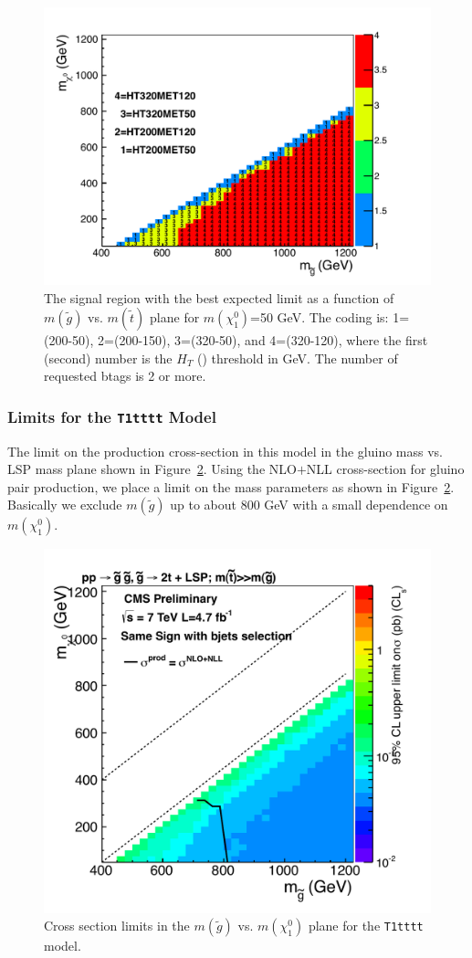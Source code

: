 \begin{figure}[htb]
\begin{center}
\includegraphics[width=0.4\linewidth]{figs/t1ttttsigreg.pdf}
\caption{The signal region with the best expected limit as a function of 
$m(\widetilde{g})$ vs. $m(\widetilde{t})$ plane for $m(\chi^0_1)$=50 GeV.
The coding is: 1=(200-50), 2=(200-150), 3=(320-50), and 4=(320-120), where
the first (second) number is the $H_T$ (\met) threshold in GeV. The number
of requested btags is 2 or more.
\label{fig:t1tttoptimize}}
\end{center}
\end{figure}


\subsubsection{Limits for the {\tt T1tttt} Model}
\label{sec:t1ttttlimits}
The limit on the production cross-section in this model in the 
gluino mass vs. LSP mass plane shown in Figure~\ref{fig:T1ttttLimit}.  
Using the 
NLO$+$NLL cross-section for gluino pair production, we place a limit
on the mass parameters as shown in Figure~\ref{fig:T1ttttLimit}.
Basically we exclude 
$m(\widetilde{g})$ up to about 800 GeV with a small dependence on 
$m(\chi_1^0)$.

\begin{figure}[htb]
\begin{center}
\includegraphics[width=0.48\linewidth]{figs/T1tttt.pdf}
\caption{Cross section limits in the $m(\widetilde{g})$ vs. $m(\chi_1^0)$ plane for the
{\tt T1tttt} model.  
\label{fig:T1ttttLimit}}
\end{center}
\end{figure}

